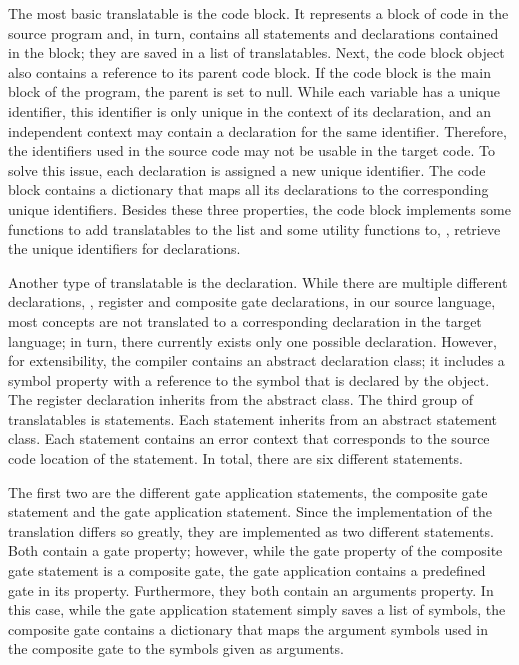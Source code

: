 The most basic translatable is the code block. It represents a block of code in the source program and, in turn, contains all statements and declarations contained in the block; they are saved in a list of translatables. Next, the code block object also contains a reference to its parent code block. If the code block is the main block of the program, the parent is set to null. While each variable has a unique identifier, this identifier is only unique in the context of its declaration, and an independent context may contain a declaration for the same identifier. Therefore, the identifiers used in the source code may not be usable in the target code. To solve this issue, each declaration is assigned a new unique identifier. The code block contains a dictionary that maps all its declarations to the corresponding unique identifiers. Besides these three properties, the code block implements some functions to add translatables to the list and some utility functions to, \eg, retrieve the unique identifiers for declarations.

Another type of translatable is the declaration. While there are multiple different declarations, \eg, register and composite gate declarations, in our source language, most concepts are not translated to a corresponding declaration in the target language; in turn, there currently exists only one possible declaration. However, for extensibility, the compiler contains an abstract declaration class; it includes a symbol property with a reference to the symbol that is declared by the object. The register declaration inherits from the abstract class.
The third group of translatables is statements. Each statement inherits from an abstract statement class. Each statement contains an error context that corresponds to the source code location of the statement. In total, there are six different statements. 

The first two are the different gate application statements, the composite gate statement and the gate application statement. Since the implementation of the translation differs so greatly, they are implemented as two different statements. Both contain a gate property; however, while the gate property of the composite gate statement is a composite gate, the gate application contains a predefined gate in its property. Furthermore, they both contain an arguments property. In this case, while the gate application statement simply saves a list of symbols, the composite gate contains a dictionary that maps the argument symbols used in the composite gate to the symbols given as arguments.

